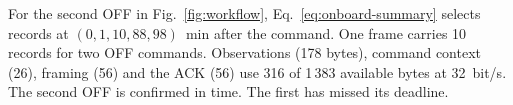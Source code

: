 For the second OFF in Fig.~\ref{fig:workflow}, Eq.~\eqref{eq:onboard-summary} selects records at $(0, 1, 10, 88, 98)$~min after the command. One frame carries 10 records for two OFF commands. Observations (178 bytes), command context (26), framing (56) and the ACK (56) use 316 of 1\,383 available bytes at 32~bit/s. The second OFF is confirmed in time. The first has missed its deadline.
